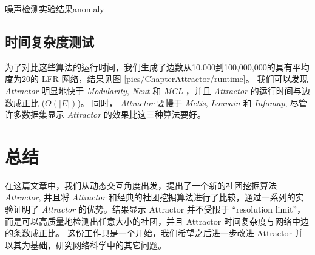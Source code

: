 \begin{pics}[htbp]{噪声检测实验结果}{anomaly}
\end{pics}

\subsection{时间复杂度测试}
为了对比这些算法的运行时间，我们生成了边数从10,000到100,000,000的具有平均度为20的 LFR 网络，结果见图 \ref{pics/ChapterAttractor/runtime}。 我们可以发现 \emph{Attractor} 明显地快于 \emph{Modularity}, \emph{Ncut} 和 \emph{MCL} ，并且 \emph{Attractor} 的运行时间与边数成正比 ($O(|E|)$)。 同时， \emph{Attractor} 要慢于 \emph{Metis}, \emph{Louvain} 和 \emph{Infomap}, 尽管许多数据集显示 \emph{Attractor} 的效果比这三种算法要好。


\section{总结}
\label{sec:conclusion}
在这篇文章中，我们从动态交互角度出发，提出了一个新的社团挖掘算法 \emph{Attractor}, 并且将 \emph{Attractor} 和经典的社团挖掘算法进行了比较，通过一系列的实验证明了 \emph{Attractor} 的优势。结果显示 Attractor 并不受限于 ``resolution limit''，而是可以高质量地检测出任意大小的社团，并且 Attractor 时间复杂度与网络中边的条数成正比。 这份工作只是一个开始，我们希望之后进一步改进 Attractor 并以其为基础，研究网络科学中的其它问题。

